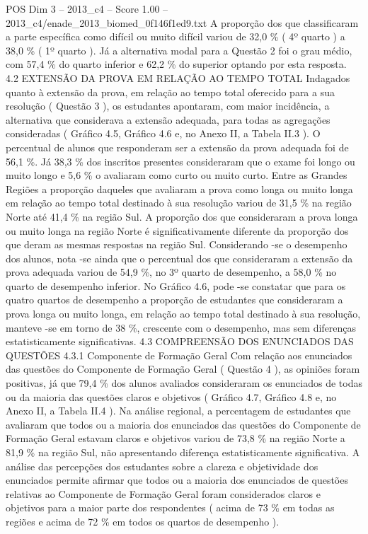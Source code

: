 \begin{textsample}{POS Dim 3 – 2013\_c4 – Score 1.00 – 2013\_c4/enade\_2013\_biomed\_0f146f1ed9.txt}
A proporção dos que classificaram a parte específica como difícil ou muito difícil variou de 32,0 \% ( 4º quarto ) a 38,0 \% ( 1º quarto ).
Já a alternativa modal para a Questão 2 foi o grau médio, com 57,4 \% do quarto inferior e 62,2 \% do superior optando por esta resposta. 4.2 EXTENSÃO DA PROVA EM RELAÇÃO AO TEMPO TOTAL Indagados quanto à extensão da prova, em relação ao tempo total oferecido para a sua resolução ( Questão 3 ), os estudantes apontaram, com maior incidência, a alternativa que considerava a extensão adequada, para todas as agregações consideradas ( Gráfico 4.5, Gráfico 4.6 e, no Anexo II, a Tabela II.3 ).
O percentual de alunos que responderam ser a extensão da prova adequada foi de 56,1 \%.
Já 38,3 \% dos inscritos presentes consideraram que o exame foi longo ou muito longo e 5,6 \% o avaliaram como curto ou muito curto.
Entre as Grandes Regiões a proporção daqueles que avaliaram a prova como longa ou muito longa em relação ao tempo total destinado à sua resolução variou de 31,5 \% na região Norte até 41,4 \% na região Sul.
A proporção dos que consideraram a prova longa ou muito longa na região Norte é significativamente diferente da proporção dos que deram as mesmas respostas na região Sul.
Considerando -se o desempenho dos alunos, nota -se ainda que o percentual dos que consideraram a extensão da prova adequada variou de 54,9 \%, no 3º quarto de desempenho, a 58,0 \% no quarto de desempenho inferior.
No Gráfico 4.6, pode -se constatar que para os quatro quartos de desempenho a proporção de estudantes que consideraram a prova longa ou muito longa, em relação ao tempo total destinado à sua resolução, manteve -se em torno de 38 \%, crescente com o desempenho, mas sem diferenças estatisticamente significativas. 4.3 COMPREENSÃO DOS ENUNCIADOS DAS QUESTÕES 4.3.1 Componente de Formação Geral Com relação aos enunciados das questões do Componente de Formação Geral ( Questão 4 ), as opiniões foram positivas, já que 79,4 \% dos alunos avaliados consideraram os enunciados de todas ou da maioria das questões claros e objetivos ( Gráfico 4.7, Gráfico 4.8 e, no Anexo II, a Tabela II.4 ).
Na análise regional, a percentagem de estudantes que avaliaram que todos ou a maioria dos enunciados das questões do Componente de Formação Geral estavam claros e objetivos variou de 73,8 \% na região Norte a 81,9 \% na região Sul, não apresentando diferença estatisticamente significativa.
A análise das percepções dos estudantes sobre a clareza e objetividade dos enunciados permite afirmar que todos ou a maioria dos enunciados de questões relativas ao Componente de Formação Geral foram considerados claros e objetivos para a maior parte dos respondentes ( acima de 73 \% em todas as regiões e acima de 72 \% em todos os quartos de desempenho ).

\end{textsample}
